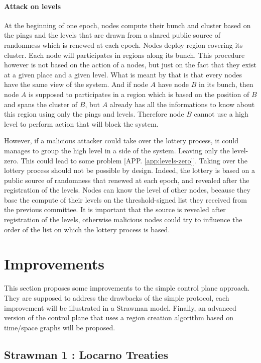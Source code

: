 \documentclass[a4paper,11pt,oneside]{report}
\begin{document}
\subsubsection{Attack on levels} \label{sec:ControlePlane-Threat-Model}
At the beginning of one epoch, nodes compute their bunch and cluster based on
the pings and the levels that are drawn from a shared public source of randomness
which is renewed at each epoch. Nodes deploy region covering its cluster. Each
node will participates in regions along its bunch. This procedure however is
not based on the action of a nodes, but just on the fact that they exist at a
given place and a given level. What is meant by that is that every nodes have
the same view of the system. And if node $A$ have node $B$ in its bunch, then
node $A$ is supposed to participates in a region which is based on the position
of $B$ and spans the cluster of $B$, but $A$ already has all the informations
to know about this region using only the pings and levels. Therefore node $B$
cannot use a high level to perform action that will block the system. 

However, if a malicious attacker could take over the lottery process, it could
manages to group the high level in a side of the system. Leaving only the
level-zero. This could lead to some problem [APP. \autoref{app:levels-zero}].
Taking over the lottery process should not be possible by design.  Indeed, the
lottery is based on a public source of randomness that renewed at each epoch,
and revealed after the registration of the levels. Nodes can know the level of
other nodes, because they base the compute of their levels on the
threshold-signed list they received from the previous committee.  It is
important that the source is revealed after registration of the levels,
otherwise malicious nodes could try to influence the order of the list on which
the lottery process is based. 

\chapter{Improvements} \label{chap:Improvements}
This section proposes some improvements to the simple control plane approach. They
are supposed to address the drawbacks of the simple protocol, each improvement
will be illustrated in a Strawman model. Finally, an advanced
version of the control plane that uses a region creation algorithm based on
time/space graphs will be proposed. 

\section{Strawman 1 : Locarno Treaties} \label{Locarno}
\end{document}
